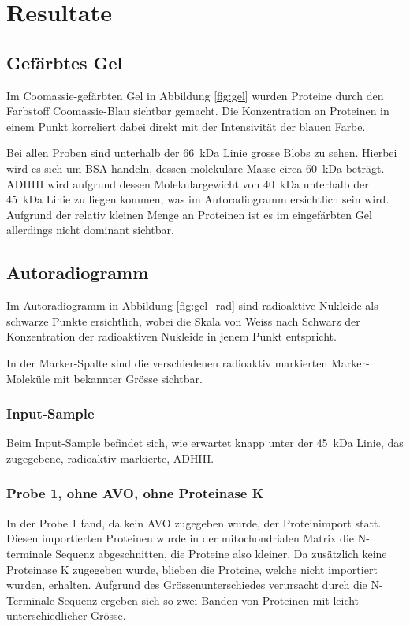 \documentclass[a4paper,german]{scrreprt}
\begin{document}
\chapter{Resultate}

\section{Gefärbtes Gel}

Im Coomassie-gefärbten Gel in Abbildung \ref{fig:gel} wurden Proteine durch den
Farbstoff Coomassie-Blau sichtbar gemacht. Die Konzentration an Proteinen in
einem Punkt korreliert dabei direkt mit der Intensivität der blauen Farbe.

Bei allen Proben sind unterhalb der \SI{66}{\kilo\dalton} Linie grosse Blobs zu
sehen. Hierbei wird es sich um BSA handeln, dessen molekulare Masse circa
\SI{60}{\kilo\dalton} beträgt. ADHIII wird aufgrund dessen Molekulargewicht von
\SI{40}{\kilo\dalton} unterhalb der \SI{45}{\kilo\dalton} Linie zu liegen
kommen, was im Autoradiogramm ersichtlich sein wird. Aufgrund der relativ
kleinen Menge an
Proteinen ist es im eingefärbten Gel allerdings nicht dominant sichtbar.

\section{Autoradiogramm}

Im Autoradiogramm in Abbildung \ref{fig:gel_rad} sind radioaktive Nukleide als
schwarze Punkte ersichtlich, wobei die Skala von Weiss nach Schwarz der
Konzentration der radioaktiven Nukleide in jenem Punkt entspricht.

In der Marker-Spalte sind die verschiedenen radioaktiv markierten
Marker-Moleküle mit bekannter Grösse sichtbar.

\subsection{Input-Sample}

Beim Input-Sample befindet sich, wie erwartet knapp unter der
\SI{45}{\kilo\dalton} Linie, das zugegebene, radioaktiv markierte, ADHIII.

\subsection{Probe 1, ohne AVO, ohne Proteinase K}

In der Probe 1 fand, da kein AVO zugegeben wurde, der Proteinimport statt.
Diesen importierten Proteinen wurde in der mitochondrialen Matrix die
N-terminale Sequenz abgeschnitten, die Proteine also kleiner. Da zusätzlich
keine Proteinase K zugegeben wurde, blieben die Proteine, welche nicht
importiert wurden, erhalten. Aufgrund des Grössenunterschiedes verursacht durch
die N-Terminale Sequenz ergeben sich so zwei Banden von Proteinen mit leicht
unterschiedlicher Grösse.
\end{document}
